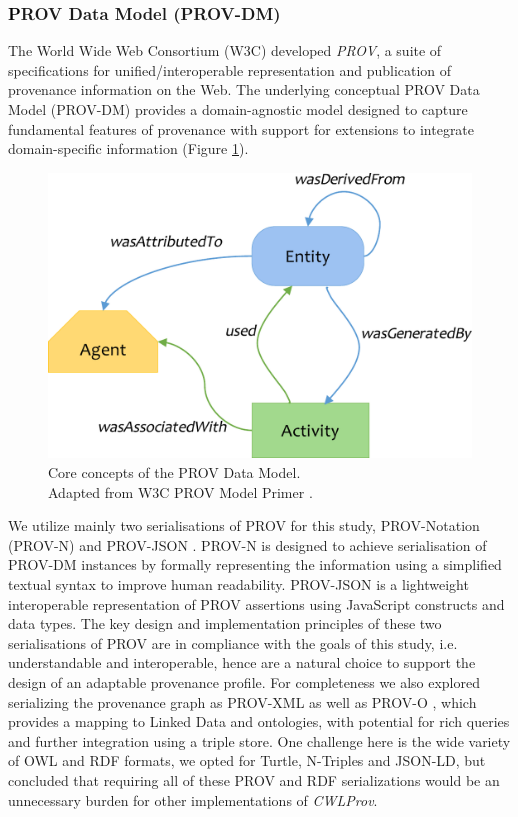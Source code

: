 \documentclass[a4paper,num-refs]{oup-contemporary}
\begin{document}
\subsubsection{\textcolor{black}PROV Data Model (PROV-DM)} 
The World Wide Web Consortium (W3C) developed \emph{PROV}, a suite of specifications for unified/interoperable representation and publication of provenance information on the Web. The underlying conceptual PROV Data Model (PROV-DM) \citep{PROVDM} provides a domain-agnostic model designed to capture fundamental features of provenance with support for extensions to integrate domain-specific information (Figure \ref{fig:prov-dm}).
\begin{figure} [!b] 
\centering 
\includegraphics[width=\linewidth]{images/key-concepts.pdf}
\captionsetup{justification=centering}
\caption{Core concepts of the PROV Data Model. \\Adapted from W3C PROV Model Primer \citep{PROVModel}. }\label{fig:prov-dm}
\end{figure}

We utilize mainly two serialisations of PROV for this study, PROV-Notation (PROV-N) \citep{moreau_2013} and PROV-JSON \citep{huynh_2013}. PROV-N is designed to achieve serialisation of PROV-DM instances by formally representing the information using a simplified textual syntax to improve human readability. PROV-JSON is a lightweight interoperable representation of PROV assertions using JavaScript constructs and data types. The key design and implementation principles of these two serialisations of PROV are in compliance with the goals of this study, i.e. understandable and interoperable, hence are a natural choice to support the design of an adaptable provenance profile. For completeness we also explored serializing the provenance graph as PROV-XML \citep{PROVXML} as well as PROV-O \citep{PROVO}, which provides a mapping to Linked Data and ontologies, with potential for rich queries and further integration using a triple store. One challenge here is the wide variety of OWL and RDF formats, we opted for Turtle, N-Triples and JSON-LD, but concluded that requiring all of these PROV and RDF serializations would be an unnecessary burden for other  implementations of \textit{CWLProv}.
\end{document}
